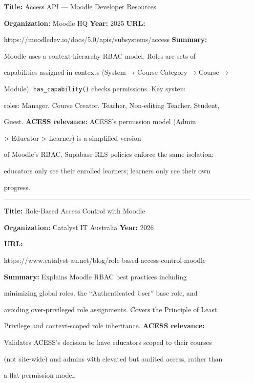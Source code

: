 \documentclass[12pt, oneside]{article} %
\begin{document}
\textbf{Title:} Access API --- Moodle Developer Resources

\textbf{Organization:} Moodle HQ \textbf{Year:} 2025 \textbf{URL:}

https://moodledev.io/docs/5.0/apis/subsystems/access \textbf{Summary:}

Moodle uses a context-hierarchy RBAC model. Roles are sets of

capabilities assigned in contexts (System → Course Category → Course →

Module). \texttt{has\_capability()} checks permissions. Key system

roles: Manager, Course Creator, Teacher, Non-editing Teacher, Student,

Guest. \textbf{ACESS relevance:} ACESS's permission model (Admin

\textgreater{} Educator \textgreater{} Learner) is a simplified version

of Moodle's RBAC. Supabase RLS policies enforce the same isolation:

educators only see their enrolled learners; learners only see their own

progress.



\begin{center}\rule{0.5\linewidth}{0.5pt}\end{center}



\textbf{Title:} Role-Based Access Control with Moodle

\textbf{Organization:} Catalyst IT Australia \textbf{Year:} 2026

\textbf{URL:}

https://www.catalyst-au.net/blog/role-based-access-control-moodle

\textbf{Summary:} Explains Moodle RBAC best practices including

minimizing global roles, the ``Authenticated User'' base role, and

avoiding over-privileged role assignments. Covers the Principle of Least

Privilege and context-scoped role inheritance. \textbf{ACESS relevance:}

Validates ACESS's decision to have educators scoped to their courses

(not site-wide) and admins with elevated but audited access, rather than

a flat permission model.
\end{document}
